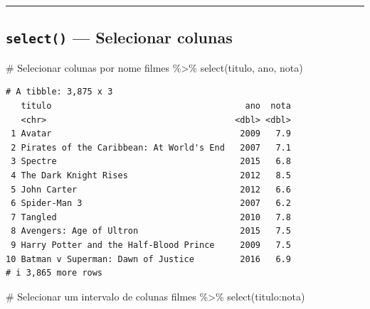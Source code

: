 \documentclass[
  letterpaper,
]{scrbook}
\newenvironment{Shaded}{\begin{snugshade}}{\end{snugshade}}
\newcommand{\CommentTok}[1]{\textcolor[rgb]{0.37,0.37,0.37}{#1}}
\newcommand{\FunctionTok}[1]{\textcolor[rgb]{0.28,0.35,0.67}{#1}}
\newcommand{\NormalTok}[1]{\textcolor[rgb]{0.00,0.23,0.31}{#1}}
\newcommand{\SpecialCharTok}[1]{\textcolor[rgb]{0.37,0.37,0.37}{#1}}
\begin{document}
\begin{center}\rule{0.5\linewidth}{0.5pt}\end{center}

\subsection{\texorpdfstring{\texttt{select()} --- Selecionar
colunas}{select() --- Selecionar colunas}}\label{select-selecionar-colunas}

\begin{Shaded}
\begin{Highlighting}[]
\CommentTok{\# Selecionar colunas por nome}
\NormalTok{filmes }\SpecialCharTok{\%\textgreater{}\%} 
  \FunctionTok{select}\NormalTok{(titulo, ano, nota)}
\end{Highlighting}
\end{Shaded}

\begin{verbatim}
# A tibble: 3,875 x 3
   titulo                                      ano  nota
   <chr>                                     <dbl> <dbl>
 1 Avatar                                     2009   7.9
 2 Pirates of the Caribbean: At World's End   2007   7.1
 3 Spectre                                    2015   6.8
 4 The Dark Knight Rises                      2012   8.5
 5 John Carter                                2012   6.6
 6 Spider-Man 3                               2007   6.2
 7 Tangled                                    2010   7.8
 8 Avengers: Age of Ultron                    2015   7.5
 9 Harry Potter and the Half-Blood Prince     2009   7.5
10 Batman v Superman: Dawn of Justice         2016   6.9
# i 3,865 more rows
\end{verbatim}

\begin{Shaded}
\begin{Highlighting}[]
\CommentTok{\# Selecionar um intervalo de colunas}
\NormalTok{filmes }\SpecialCharTok{\%\textgreater{}\%} 
  \FunctionTok{select}\NormalTok{(titulo}\SpecialCharTok{:}\NormalTok{nota)}
\end{Highlighting}
\end{Shaded}
\end{document}
